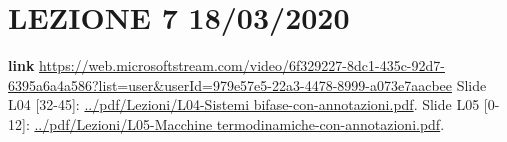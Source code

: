 \section*{LEZIONE 7 18/03/2020}
\textbf{link} \url{https://web.microsoftstream.com/video/6f329227-8dc1-435c-92d7-6395a6a4a586?list=user&userId=979e57e5-22a3-4478-8999-a073e7aacbee}\newline
\newline
Slide L04 [32-45]: \url{../pdf/Lezioni/L04-Sistemi bifase-con-annotazioni.pdf}.\newline
\newline
Slide L05 [0-12]: \url{../pdf/Lezioni/L05-Macchine termodinamiche-con-annotazioni.pdf}.\newline
\newline





